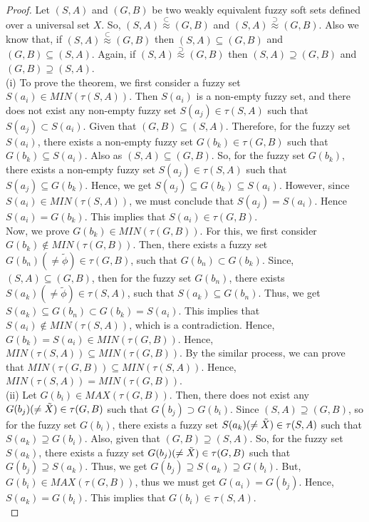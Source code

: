 \documentclass{article}
\theoremstyle{definition}
\begin{document}
 \begin{proof}
  Let $(S, A)$ and $(G, B)$ be two weakly equivalent fuzzy soft sets defined over a universal set $X$. So, $(S, A)\stackrel{\subset}{\approx}(G, B)$ and $(S, A)\stackrel{\supset}{\approx}(G, B)$. Also we know that, if $(S, A)\stackrel{\subset}{\approx}(G, B)$ then $(S, A) \subseteq (G, B)$ and $(G, B)\subseteq (S, A)$. Again, if $(S, A)\stackrel{\supset}{\approx}(G, B)$ then $(S, A) \supseteq (G, B)$ and $(G, B)\supseteq (S, A)$.\\

 (i) To prove the theorem, we first consider a fuzzy set $S(a_i)\in MIN(\tau(S,A))$. Then $S(a_i)$ is a non-empty fuzzy set, and there does not exist any non-empty fuzzy set $S(a_j) \in \tau(S,A)$ such that  $S(a_j) \subset S(a_i)$. Given that $(G, B)\subseteq (S, A)$. Therefore, for the fuzzy set $S(a_i)$, there exists a non-empty fuzzy set $G(b_k) \in \tau(G,B)$ such that $G(b_k) \subseteq S(a_i)$. Also as $(S,A) \subseteq (G,B)$. So, for the fuzzy set $G(b_k)$, there exists a non-empty fuzzy set $S(a_j) \in \tau(S,A)$ such that $S(a_j) \subseteq G(b_k)$.
Hence, we get $S(a_j)\subseteq G(b_k)\subseteq S(a_i)$. However, since $S(a_i)\in MIN(\tau(S,A))$, we must conclude that $S(a_j)=S(a_i)$. Hence $ S(a_i)=G(b_k)$. This implies that $S(a_i)\in \tau(G,B)$.\\


Now, we prove $G(b_k)\in MIN(\tau(G,B))$. For this, we first consider $G(b_k)\notin MIN(\tau(G,B))$. Then, there exists a fuzzy set $G(b_n)(\neq \tilde{\phi})\in \tau(G,B)$, such that $ G(b_n) \subset G(b_k)$. Since, $(S,A)\subseteq (G,B)$, then for the fuzzy set $G(b_n)$, there exists $S(a_k) (\neq \tilde{\phi})\in \tau(S,A)$, such that $S(a_k)\subseteq G(b_n)$.
Thus, we get $S(a_k)\subseteq G(b_n) \subset G(b_k) = S(a_i)$. This implies that $S(a_i) \notin MIN(\tau(S,A))$, which is a contradiction. Hence, $G(b_k)=S(a_i)\in MIN(\tau(G,B))$. Hence, $MIN(\tau(S,A)) \subseteq MIN(\tau(G,B))$. By the similar process, we can prove that $MIN(\tau(G,B)) \subseteq MIN(\tau(S,A))$. Hence, $MIN(\tau(S,A))=MIN(\tau(G,B))$.\\
 


(ii)
Let $G(b_i) \in MAX(\tau(G, B))$. Then, there does not exist any $G(b_j) (\neq \Tilde{X}) \in \tau (G, B)$ such that $G(b_j)\supset G(b_i)$. Since $(S, A)\supseteq (G, B)$, so for the fuzzy set $G(b_i)$, there exists a fuzzy set $S(a_k) (\neq \Tilde{X}) \in \tau(S, A)$ such that $S(a_k) \supseteq G(b_i)$. Also, given that $(G, B) \supseteq (S, A)$. So, for the fuzzy set $S(a_k)$, there exists a fuzzy set $G(b_j)(\neq \Tilde{X}) \in \tau(G, B)$ such that $ G(b_j) \supseteq S(a_k)$. Thus, we get $G(b_j)\supseteq S(a_k)\supseteq G(b_i)$. But, $G(b_i)\in MAX(\tau(G, B))$, thus we must get  $G(a_i)=G(b_j)$. Hence, $S(a_k)=G(b_i)$. This implies that $G(b_i)\in \tau(S, A)$.\\



\end{proof}
\end{document}
